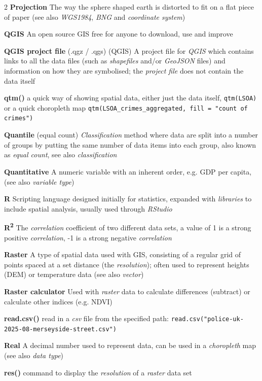\documentclass[a4paper,10pt]{article}
\begin{document}
\begin{multicols}{2}
\textbf{Projection} The way the sphere shaped earth is distorted to fit on a flat piece of paper (see also \textit{WGS1984}, \textit{BNG} and \textit{coordinate system})

\textbf{QGIS} An open source GIS free for anyone to download, use and improve

\textbf{QGIS project file} (.qgz / .qgs) (QGIS) A project file for \textit{QGIS} which contains links to all the data files (such as \textit{shapefiles} and/or \textit{GeoJSON} files) and information on how they are symbolised; the \textit{project file} does not contain the data itself

\textbf{qtm()} a quick way of showing spatial data, either just the data itself, \texttt{qtm(LSOA)} or a quick choropleth map \texttt{qtm(LSOA\_crimes\_aggregated, fill = "count of crimes")}

\textbf{Quantile} (equal count) \textit{Classification} method where data are split into a number of groups by putting the same number of data items into each group, also known as \textit{equal count}, see also \textit{classification}

\textbf{Quantitative} A numeric variable with an inherent order, e.g. GDP per capita, (see also \textit{variable type})

\textbf{R} Scripting language designed initially for statistics, expanded with \textit{libraries} to include spatial analysis, usually used through  \textit{RStudio}

\textbf{R\textsuperscript{2}} The \textit{correlation} coefficient of two different data sets, a value of 1 is a strong positive \textit{correlation}, -1 is a strong negative \textit{correlation}

\textbf{Raster} A type of spatial data used with GIS, consisting of a regular grid of points spaced at a set distance (the \textit{resolution}); often used to represent heights (DEM) or temperature data (see also \textit{vector})

\textbf{Raster calculator} Used with \textit{raster} data to calculate differences (subtract) or calculate other indices (e.g. NDVI)

\textbf{read.csv()} read in a \textit{csv} file from the specified path: \texttt{read.csv("police-uk-2025-08-merseyside-street.csv")}

\textbf{Real} A decimal number used to represent data, can be used in a \textit{choropleth} map (see also \textit{data type}) 

\textbf{res()} command to display the \textit{resolution} of a \textit{raster} data set


\end{multicols}
\end{document}
